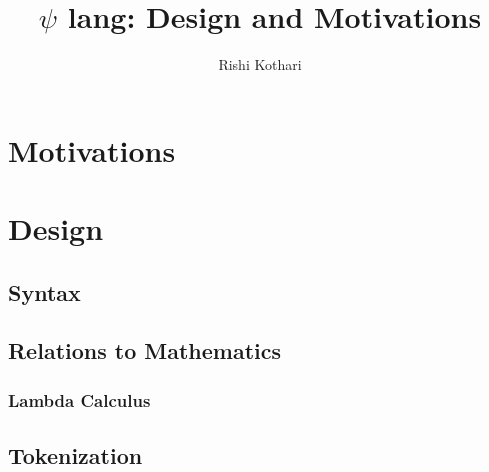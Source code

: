 \documentclass[11pt, oneside]{article}   	%
\title{$\psi$ lang: Design and Motivations}
\author{Rishi Kothari}
\date{}
\begin{document}
\maketitle

\newpage

\tableofcontents

\newpage

\section{Motivations}


\section{Design}

\subsection{Syntax}

\subsection{Relations to Mathematics}

\subsubsection{Lambda Calculus}

\subsection{Tokenization}
\end{document}
